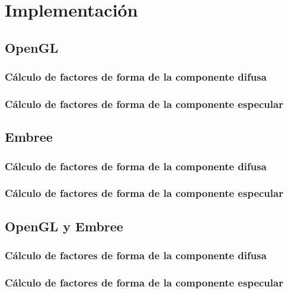\chapter{Implementación}
\label{ch:chap04}

\section{OpenGL}
\label{sec:opengl-impl}

\subsection{Cálculo de factores de forma de la componente difusa}

\subsection{Cálculo de factores de forma de la componente especular}


\section{Embree}
\label{sec:embree-impl}

\subsection{Cálculo de factores de forma de la componente difusa}

\subsection{Cálculo de factores de forma de la componente especular}

\section{OpenGL y Embree}
\label{sec:openglyembree-impl}

\subsection{Cálculo de factores de forma de la componente difusa}

\subsection{Cálculo de factores de forma de la componente especular}
